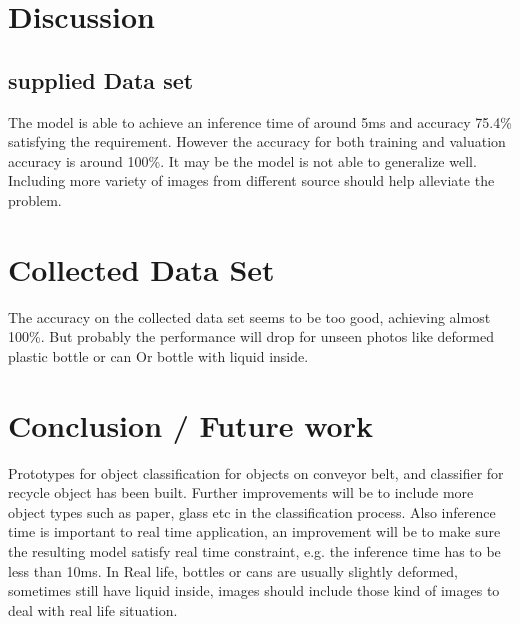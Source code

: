 \documentclass[10pt,journal,compsoc]{IEEEtran}
\begin{document}
\section{Discussion}
\subsection{supplied Data set}
The model is able to achieve an inference time of around 5ms and accuracy 75.4\% satisfying the requirement. However the accuracy for both training and valuation accuracy is around 100\%. It may be the model is not able to generalize well. Including more variety of images from different source should help alleviate the problem.

\section{Collected Data Set}
The accuracy on the collected data set seems to be too good, achieving almost 100\%. But probably the performance will drop for unseen photos like deformed plastic bottle or can Or bottle with liquid inside.

\section{Conclusion / Future work}
Prototypes for object classification for objects on conveyor belt, and classifier for recycle object has been built.
Further improvements will be to include more object types such as paper, glass etc in the classification process. Also inference time is important to real time application, an improvement will be to make sure the resulting model satisfy real time constraint, e.g. the inference time has to be less than 10ms.
In Real life, bottles or cans are usually slightly deformed, sometimes still have liquid inside, images should include those kind of images to deal with real life situation. 
\end{document}
